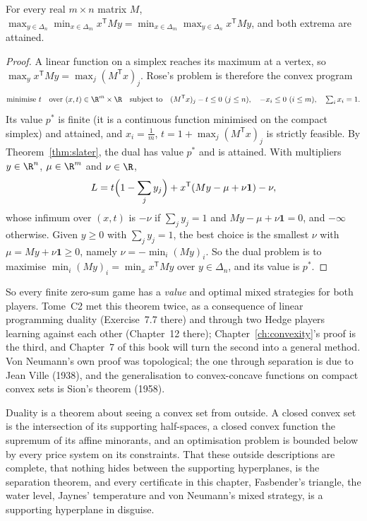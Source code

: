 \begin{theorem}\label{thm:minimax}
For every real $m\times n$ matrix $M$, $\displaystyle\max_{y\in\Delta_n}\min_{x\in\Delta_m}x^{\mathsf T}My=\min_{x\in\Delta_m}\max_{y\in\Delta_n}x^{\mathsf T}My$, and both extrema are attained.
\end{theorem}
\begin{proof}
A linear function on a simplex reaches its maximum at a vertex, so $\max_yx^{\mathsf T}My=\max_j(M^{\mathsf T}x)_j$. Rose's problem is therefore the convex program
\[
\text{minimise }t\quad\text{over }(x,t)\in\R^m\times\R\quad\text{subject to}\quad(M^{\mathsf T}x)_j-t\le0\ (j\le n),\quad-x_i\le0\ (i\le m),\quad\textstyle\sum_ix_i=1.
\]
Its value $p^*$ is finite (it is a continuous function minimised on the compact simplex) and attained, and $x_i=\frac1m$, $t=1+\max_j(M^{\mathsf T}x)_j$ is strictly feasible. By Theorem~\ref{thm:slater},
the dual has value $p^*$ and is attained. With multipliers $y\in\R^n$, $\mu\in\R^m$ and $\nu\in\R$,
\[
L=t\Bigl(1-\sum_jy_j\Bigr)+x^{\mathsf T}(My-\mu+\nu\mathbf1)-\nu,
\]
whose infimum over $(x,t)$ is $-\nu$ if $\sum_jy_j=1$ and $My-\mu+\nu\mathbf1=0$, and $-\infty$ otherwise. Given $y\ge0$ with $\sum_jy_j=1$, the best choice is the smallest $\nu$ with
$\mu=My+\nu\mathbf1\ge0$, namely $\nu=-\min_i(My)_i$. So the dual problem is to maximise $\min_i(My)_i=\min_xx^{\mathsf T}My$ over $y\in\Delta_n$, and its value is $p^*$.
\end{proof}

So every finite zero-sum game has a \emph{value} and optimal mixed strategies for both players. Tome~C2 met this theorem twice, as a consequence of linear programming
duality (Exercise~7.7 there) and through two Hedge players learning against each other (Chapter~12 there); Chapter~\ref{ch:convexity}'s proof is the third, and
Chapter~7 of this book will turn the second into a general method. Von Neumann's own proof was topological; the one through separation is due to Jean Ville
(1938), and the generalisation to convex-concave functions on compact convex sets is Sion's theorem (1958).

\begin{beauty}
Duality is a theorem about seeing a convex set from outside. A closed convex set is the intersection of its supporting half-spaces, a closed convex function the
supremum of its affine minorants, and an optimisation problem is bounded below by every price system on its constraints. That these outside descriptions
are complete, that nothing hides between the supporting hyperplanes, is the separation theorem, and every certificate in this chapter, Fasbender's triangle,
the water level, Jaynes' temperature and von Neumann's mixed strategy, is a supporting hyperplane in disguise.
\end{beauty}

